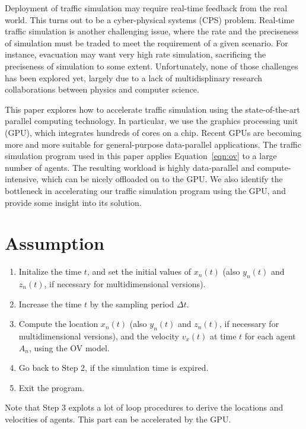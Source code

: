 \documentclass[times, 10pt, twocolumn]{article}
\begin{document}
Deployment of traffic simulation may require real-time feedback from the
real world.
This turns out to be a cyber-physical systems (CPS) problem.
Real-time traffic simulation is another challenging issue, where
the rate and the preciseness of simulation must be traded to meet the
requirement of a given scenario.
For instance, evacuation may want very high rate simulation, sacrificing
the preciseness of simulation to some extent.
Unfortunately, none of those challenges has been explored yet, largely
due to a lack of multidisplinary research collaborations between physics
and computer science.

This paper explores how to accelerate traffic simulation using the
state-of-the-art parallel computing technology.
In particular, we use the graphics processing unit (GPU), which
integrates hundreds of cores on a chip.
Recent GPUs are becoming more and more suitable for general-purpose
data-parallel applications.
The traffic simulation program used in this paper applies
Equation~\eqref{eqn:ov} to a large number of agents.
The resulting workload is highly data-parallel and compute-intensive,
which can be nicely offloaded on to the GPU.
We also identify the bottleneck in accelerating our traffic simulation
program using the GPU, and provide some insight into its solution.

\section{Assumption}
\label{sec:assumption}

\begin{enumerate}
 \item Initalize the time $t$, and set the initial values of $x_n(t)$
       (also $y_n(t)$ and $z_n(t)$, if necessary for multidimensional
       versions).
 \item Increase the time $t$ by the sampling period $\Delta t$.
 \item Compute the location $x_n(t)$ (also $y_n(t)$ and $z_n(t)$, if
       necessary for multidimensional versions), and the velocity
       $v_x(t)$ at time $t$ for each agent $A_n$, using the OV model.
 \item Go back to Step 2, if the simulation time is expired.
 \item Exit the program.
\end{enumerate}

Note that Step 3 explots a lot of loop procedures to derive the
locations and velocities of agents.
This part can be accelerated by the GPU.
\end{document}
